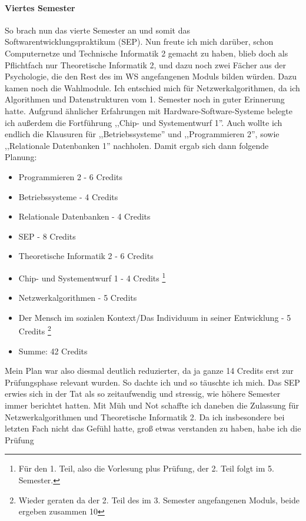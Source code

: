 \paragraph{Viertes Semester}
So brach nun das vierte Semester an und somit das
Softwarentwicklungspraktikum (SEP). Nun freute ich mich darüber, schon
Computernetze und Technische Informatik 2 gemacht zu haben, blieb doch
als Pflichtfach nur Theoretische Informatik 2, und dazu noch zwei
Fächer aus der Psychologie, die den Rest des im WS angefangenen Moduls
bilden würden. Dazu kamen noch die Wahlmodule. Ich entschied
mich für Netzwerkalgorithmen, da ich Algorithmen und Datenstrukturen
vom 1. Semester noch in guter Erinnerung hatte. Aufgrund ähnlicher
Erfahrungen mit Hardware-Software-Systeme belegte ich außerdem die
Fortführung ,,Chip- und Systementwurf 1''.  Auch wollte ich endlich
die Klausuren für ,,Betriebssysteme'' und ,,Programmieren 2'', sowie
,,Relationale Datenbanken 1''
nachholen. Damit ergab sich dann folgende Planung:
\begin{itemize}
 \item Programmieren 2 - 6 Credits
 \item Betriebssysteme - 4 Credits
\item Relationale Datenbanken - 4 Credits
\item SEP - 8 Credits
\item Theoretische Informatik 2 - 6 Credits
\item Chip- und Systementwurf 1 - 4 Credits \footnote{Für den 1. Teil,
    also die Vorlesung plus Prüfung, der 2. Teil folgt im 5. Semester.}
\item Netzwerkalgorithmen       - 5 Credits
\item Der Mensch im sozialen Kontext/Das Individuum in seiner Entwicklung - 5 Credits \footnote{Wieder geraten da der 2. Teil
    des im 3. Semester angefangenen Moduls, beide ergeben zusammen 10}
\item Summe: 42  Credits
\end{itemize}
Mein Plan war also diesmal deutlich reduzierter, da ja ganze 14 Credits
erst zur Prüfungsphase relevant wurden. So dachte ich und so täuschte
ich mich. Das SEP erwies sich in der Tat als so zeitaufwendig und
stressig, wie höhere Semester immer berichtet hatten. Mit Müh und Not
schaffte ich daneben die Zulassung für Netzwerkalgorithmen und
Theoretische Informatik 2. Da ich insbesondere bei letzten Fach nicht
das Gefühl hatte, groß etwas verstanden zu haben, habe ich die Prüfung
